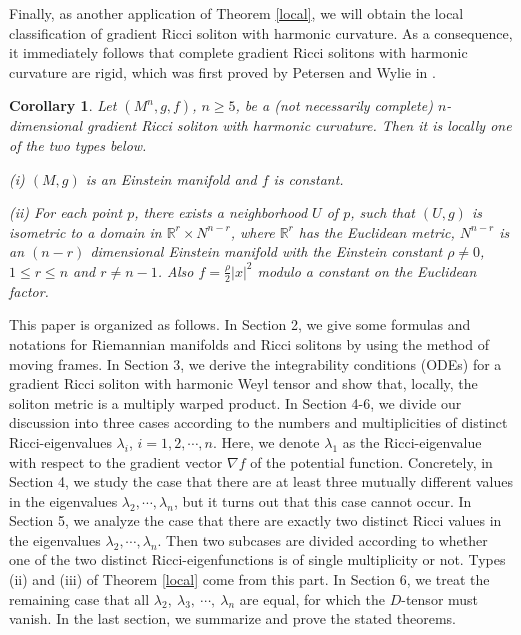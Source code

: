 \documentclass{amsart}
\newtheorem{corollary}[theorem]{Corollary}
\theoremstyle{definition}
\theoremstyle{remark}
\numberwithin{equation}{section}
\begin{document}
Finally, as another application of Theorem \ref{local},  we will obtain the local classification of gradient Ricci soliton with harmonic curvature. As a consequence, it immediately follows that complete gradient Ricci solitons with harmonic curvature are rigid, which was first proved by Petersen and Wylie in \cite{PW}.
\begin{corollary} \label{harcur}
	Let $(M^n, g, f)$, $n\geq 5$, be a (not necessarily complete) 
	$n$-dimensional gradient Ricci soliton with harmonic curvature. 
	Then it is locally one of the two types  below.
	
	\smallskip
	{\rm (i)} $(M, g)$ is an Einstein manifold and $f$ is constant.
	
	\smallskip	
	{\rm (ii)}  
	For each point $p$, there exists a neighborhood $U$ of $p$, such that
	$(U, g)$ is isometric to a domain in $ \mathbb{R}^{r}\times N^{n-r}$,
	where $\mathbb{R}^{r}$ has the Euclidean metric, 
	$N^{n-r}$ is an $(n-r)$ dimensional Einstein manifold
	with the Einstein constant $\rho\neq 0$, $1 \leq r\leq n$ and $ r\neq n-1$.
	Also $f = \frac{\rho}{2} |x|^2$ modulo a constant on the Euclidean factor.
 \end{corollary}

This paper is organized as follows. 
In Section 2, we give some formulas and notations for Riemannian manifolds
and Ricci solitons by using the method of moving frames.
In Section 3, we derive the integrability conditions (ODEs) for a gradient Ricci soliton with harmonic Weyl tensor
and show that, locally, the soliton metric is a multiply warped product.
In Section 4-6, we divide our discussion into three cases according to the numbers and multiplicities of distinct
Ricci-eigenvalues $\lambda_i$, $i=1,2,\cdots, n$.
Here, we denote $\lambda_1$ as the Ricci-eigenvalue with respect to the gradient vector $\nabla f$ of the potential function. 
Concretely, in Section 4, we study the case that
there are at least three mutually different values in the eigenvalues 
$\lambda_2, \cdots, \lambda_n$,
but it turns out that this case cannot occur.
In Section 5, we analyze the case that 
there are exactly two distinct Ricci values in the eigenvalues $\lambda_2, \cdots, \lambda_n$.
Then two subcases are divided according to 
whether one of the two distinct Ricci-eigenfunctions is of single multiplicity or not.
Types {\rm (ii)} and {\rm (iii)} of Theorem \ref{local} come from this part.
In Section 6, we treat the remaining case that all $\lambda_2,~\lambda_3,~\cdots,~\lambda_n$ are equal,
for which the $D$-tensor must vanish. 
In the last section, we summarize and prove the stated theorems.
\end{document}

